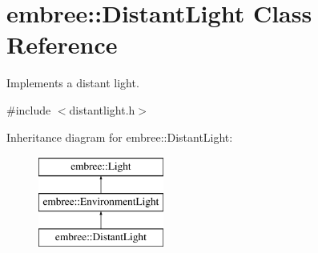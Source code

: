 \hypertarget{classembree_1_1_distant_light}{
\section{embree::DistantLight Class Reference}
\label{classembree_1_1_distant_light}
}


Implements a distant light.  




{\ttfamily \#include $<$distantlight.h$>$}

Inheritance diagram for embree::DistantLight:\begin{figure}[H]
\begin{center}
\leavevmode
\includegraphics[height=3.000000cm]{classembree_1_1_distant_light}
\end{center}
\end{figure}
